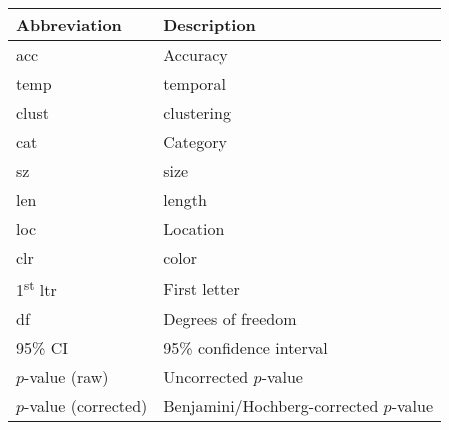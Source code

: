 \begin{tabular}{ll}
\toprule
             Abbreviation &                            Description \\
\midrule
                      acc &                               Accuracy \\
                     temp &                               temporal \\
                    clust &                             clustering \\
                      cat &                               Category \\
                       sz &                                   size \\
                      len &                                 length \\
                      loc &                               Location \\
                      clr &                                  color \\
1\textsuperscript{st} ltr &                           First letter \\
                       df &                     Degrees of freedom \\
                  95\% CI &               95\% confidence interval \\
          $p$-value (raw) &                  Uncorrected $p$-value \\
    $p$-value (corrected) & Benjamini/Hochberg-corrected $p$-value \\
\bottomrule
\end{tabular}

